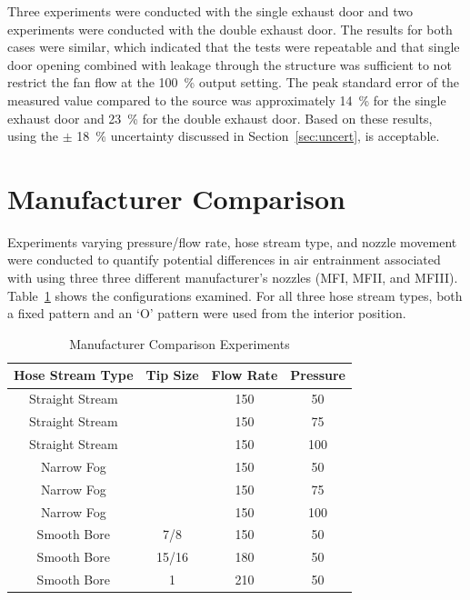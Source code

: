 \documentclass[12pt,oneside]{book}
\begin{document}
Three experiments were conducted with the single exhaust door and two experiments were conducted with the double exhaust door. The results for both cases were similar, which indicated that the tests were repeatable and that single door opening combined with leakage through the structure was sufficient to not restrict the fan flow at the 100~\% output setting. The peak standard error of the measured value compared to the source was approximately 14~\% for the single exhaust door and 23~\% for the double exhaust door. Based on these results, using the $\pm$ 18~\% uncertainty discussed in Section~\ref{sec:uncert}, is acceptable.

\section{Manufacturer Comparison}
\label{sec:manu}

Experiments varying pressure/flow rate, hose stream type, and nozzle movement were conducted to quantify potential differences in air entrainment associated with using three three different manufacturer's nozzles (MFI, MFII, and MFIII). Table~\ref{tab:Manufacturer_Comparison_Experiments} shows the configurations examined. For all three hose stream types, both a fixed pattern and an `O' pattern were used from the interior position.

\begin{table}[!ht]
\centering
\caption{Manufacturer Comparison Experiments}
\label{tab:Manufacturer_Comparison_Experiments}
\begin{tabular}{cccc}
\toprule[1.5pt]
Hose Stream Type & Tip Size & Flow Rate & Pressure \\ 
\midrule
Straight Stream &       & 150 & 50 \\
Straight Stream &       & 150 & 75 \\
Straight Stream &       & 150 & 100 \\
Narrow Fog      &       & 150 & 50 \\
Narrow Fog      &       & 150 & 75 \\
Narrow Fog      &       & 150 & 100 \\
Smooth Bore     & 7/8   & 150 & 50 \\
Smooth Bore     & 15/16 & 180 & 50 \\
Smooth Bore     & 1     & 210 & 50 \\
\bottomrule[1.25pt]
\end{tabular}
\end{table}
\end{document}
